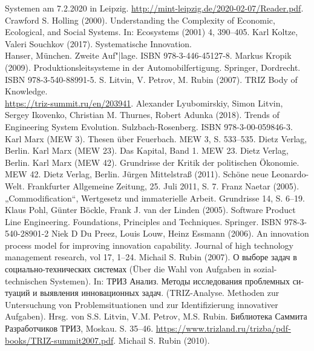 \documentclass[11pt,a4paper]{article}
\begin{document}
\begin{thebibliography}{xxx}
{    Systemen} am 7.2.2020 in Leipzig.
  \url{http://mint-leipzig.de/2020-02-07/Reader.pdf}.
 Crawford S. Holling (2000). Understanding the Complexity
  of Economic, Ecological, and Social Systems. In: Ecosystems (2001) 4,
  390–405.
 Karl Koltze, Valeri Souchkov (2017).  Systematische
  Innovation.\\ Hanser, München. Zweite Auf"|lage. ISBN 978-3-446-45127-8.
 Markus Kropik (2009). Produktionsleitsysteme in der
    Automobilfertigung. Springer, Dordrecht.\\ ISBN 978-3-540-88991-5.
 S. Litvin, V. Petrov, M. Rubin (2007). TRIZ Body of
  Knowledge. \\ \url{https://triz-summit.ru/en/203941}.
 Alexander Lyubomirskiy, Simon Litvin, Sergey Ikovenko,
  Christian M. Thurnes, Robert Adunka (2018). Trends of Engineering System
  Evolution. Sulzbach-Rosenberg.  ISBN 978-3-00-059846-3.
 Karl Marx (MEW 3).  Thesen über Feuerbach. MEW 3, S. 533--535.
  Dietz Verlag, Berlin.
 Karl Marx (MEW 23). Das Kapital, Band 1. MEW 23. Dietz Verlag,
  Berlin.
 Karl Marx (MEW 42). Grundrisse der Kritik der politischen
  Ökonomie.  MEW 42. Dietz Verlag, Berlin.
 Jürgen Mittelstraß (2011).  Schöne neue
  Leonardo-Welt.  Frankfurter Allgemeine Zeitung, 25. Juli 2011, S. 7.
 Franz Naetar (2005). „Commodification“, Wertgesetz und
  immaterielle Arbeit. Grundrisse 14, S. 6--19.
 Klaus Pohl, Günter Böckle, Frank J. van der Linden (2005).
  Software Product Line Engineering. Foundations, Principles and Techniques.
  Springer. ISBN 978-3-540-28901-2
 Niek D Du Preez, Louis Louw, Heinz Essmann (2006). An
  innovation process model for improving innovation capability.  Journal of
  high technology management research, vol 17, 1--24.
 Michail S. Rubin (2007). \foreignlanguage{russian}{О
  выборе задач в социально-технических системах} (Über die Wahl von Aufgaben
  in sozial-technischen Systemen). In: \foreignlanguage{russian}{ТРИЗ Анализ.
    Методы исследования проблемных ситуаций и выявления инновационных задач}.
  (TRIZ-Analyse. Methoden zur Untersuchung von Problemsituationen und zur
  Identifizierung innovativer Aufgaben). Hrsg. von S.S. Litvin, V.M. Petrov,
  M.S. Rubin. \foreignlanguage{russian}{Библиотека Саммита Разработчиков
    ТРИЗ}, Moskau. S. 35--46.
  \url{https://www.trizland.ru/trizba/pdf-books/TRIZ-summit2007.pdf}.
 Michail S. Rubin (2010).

\end{thebibliography}
\end{document}

